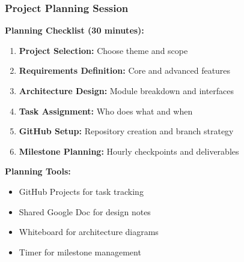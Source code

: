 \documentclass{beamer}
\begin{document}
\begin{frame}
\frametitle{Project Planning Session}
\small \textbf{Planning Checklist (30 minutes):}

\begin{enumerate}
    \item \footnotesize \textbf{Project Selection:} Choose theme and scope
    \item \footnotesize \textbf{Requirements Definition:} Core and advanced features
    \item \footnotesize \textbf{Architecture Design:} Module breakdown and interfaces
    \item \footnotesize \textbf{Task Assignment:} Who does what and when
    \item \footnotesize \textbf{GitHub Setup:} Repository creation and branch strategy
    \item \footnotesize \textbf{Milestone Planning:} Hourly checkpoints and deliverables
\end{enumerate}

\vspace{0.3cm}
\small \textbf{Planning Tools:}
\begin{itemize}
    \item \footnotesize GitHub Projects for task tracking
    \item \footnotesize Shared Google Doc for design notes
    \item \footnotesize Whiteboard for architecture diagrams
    \item \footnotesize Timer for milestone management
\end{itemize}
\end{frame}
\end{document}
